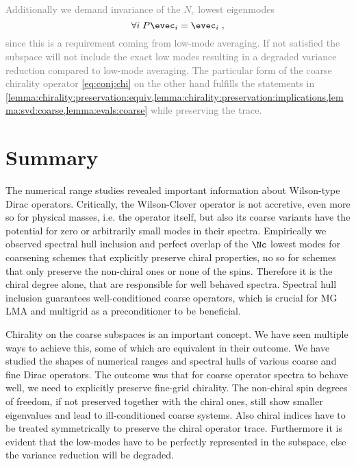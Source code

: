 \textcolor{gray}{
Additionally we demand invariance of the $N_c$ lowest eigenmodes
\begin{equation} \label{eq:conj:modes}
\forall i \; P \evec_i = \evec_i \;,
\end{equation}
since this is a requirement coming from low-mode averaging.
If not satisfied the subspace will not include the exact low modes resulting in a degraded variance reduction compared to low-mode averaging.
The particular form of the coarse chirality operator \cref{eq:conj:chi} on the other hand fulfills the statements in \cref{lemma:chirality:preservation:equiv,lemma:chirality:preservation:implications,lemma:svd:coarse,lemma:evals:coarse} while preserving the trace.
}

\section{Summary}
\label{sec:chirality:summary}

The numerical range studies revealed important information about Wilson-type Dirac operators.
Critically, the Wilson-Clover operator is not accretive, even more so for physical masses, i.e. the operator itself, but also its coarse variants have the potential for zero or arbitrarily small modes in their spectra.
Empirically we observed spectral hull inclusion and perfect overlap of the $\Nc$ lowest modes for coarsening schemes that explicitly preserve chiral properties, no so for schemes that only preserve the non-chiral ones or none of the spins.
Therefore it is the chiral degree alone, that are responsible for well behaved spectra.
Spectral hull inclusion guarantees well-conditioned coarse operators, which is crucial for MG LMA and multigrid as a preconditioner to be beneficial.

Chirality on the coarse subspaces is an important concept. %
We have seen multiple ways to achieve this, some of which are equivalent in their outcome.
We have studied the shapes of numerical ranges and spectral hulls of various coarse and fine Dirac operators.
The outcome was that for coarse operator spectra to behave well, we need to explicitly preserve fine-grid chirality.
The non-chiral spin degrees of freedom, if not preserved together with the chiral ones, still show smaller eigenvalues and lead to ill-conditioned coarse systems.
Also chiral indices have to be treated symmetrically to preserve the chiral operator trace.
Furthermore it is evident that the low-modes have to be perfectly represented in the subspace, else the variance reduction will be degraded.

